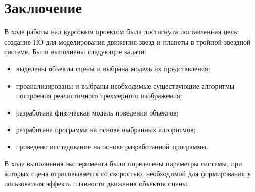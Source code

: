 \chapter*{Заключение}

В ходе работы над курсовым проектом была достигнута поставленная
цель: создание ПО для моделирования движения звезд и планеты в тройной звездной системе. Были выполнены следующие задачи:

\begin{itemize}[label=---]
	\item выделены объекты сцены и выбрана модель их представления;
	\item проанализированы и выбраны необходимые существующие алгоритмы построения реалистичного трехмерного изображения;
	\item разработана физическая модель поведения объектов;
	\item разработана программа на основе выбранных алгоритмов;
	\item проведено исследование на основе разработанной программы.
\end{itemize}

В ходе выполнения эксперимента были определены параметры системы, при которых сцена отрисовывается со скоростью, необходимой для формирования у пользователя эффекта плавности движения объектов сцены.
 


